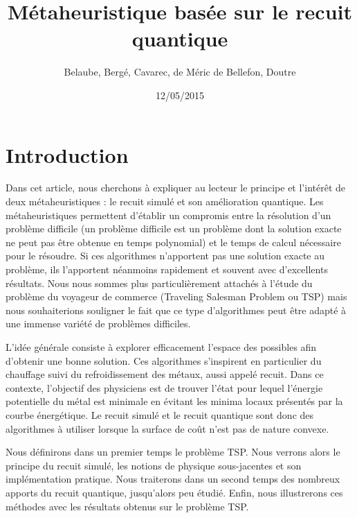 \documentclass{article}%
\begin{document}
\title{Métaheuristique basée sur le recuit quantique}
\author{Belaube, Bergé, Cavarec, de Méric de Bellefon, Doutre}
\date{12/05/2015}
\maketitle

\clearpage

\tableofcontents

\clearpage

\section*{Introduction}

\vspace{1cm}

Dans cet article, nous cherchons à expliquer au lecteur le principe et l'intérêt de deux métaheuristiques : le recuit simulé et son amélioration quantique. Les métaheuristiques permettent d'établir un compromis entre la résolution d'un problème difficile (un problème difficile est un problème dont la solution exacte ne peut pas être obtenue en temps polynomial) et le temps de calcul nécessaire pour le résoudre. Si ces algorithmes n'apportent pas une solution exacte au problème, ils l'apportent néanmoins rapidement et souvent avec d'excellents résultats. Nous nous sommes plus particulièrement attachés à l'étude du problème du voyageur de commerce (Traveling Salesman Problem ou TSP) mais nous souhaiterions souligner le fait que ce type d'algorithmes peut être adapté à une immense variété de problèmes difficiles.
 
			L'idée générale consiste à explorer efficacement l'espace des possibles afin d'obtenir une bonne solution. Ces algorithmes s'inspirent en particulier du chauffage suivi du refroidissement des métaux, aussi appelé recuit. Dans ce contexte, l'objectif des physiciens est de trouver l'état pour lequel l'énergie potentielle du métal est minimale en évitant les minima locaux présentés par la courbe énergétique. Le recuit simulé et le recuit quantique sont donc des algorithmes à utiliser lorsque la surface de coût n'est pas de nature convexe.
	
\vspace{1cm}

Nous définirons dans un premier temps le problème TSP. Nous verrons alors le principe du recuit simulé, les notions de physique sous-jacentes et son implémentation pratique. Nous traiterons dans un second temps des nombreux apports du recuit quantique, jusqu'alors peu étudié. Enfin, nous illustrerons ces méthodes avec les résultats obtenus sur le problème TSP.
		
\end{document}
